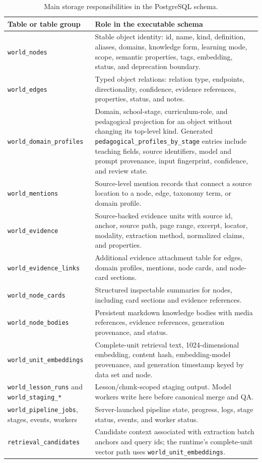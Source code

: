 \documentclass[11pt,letterpaper]{article}
\newcommand{\code}[1]{\nolinkurl{#1}}
\begin{document}
\begin{table}[H]
\centering
\small
\begin{tabularx}{\textwidth}{@{}p{}Y@{}}
\toprule
Table or table group & Role in the executable schema\\
\midrule
\code{world_nodes} & Stable object identity: id, name, kind, definition, aliases, domains, knowledge form, learning mode, scope, semantic properties, tags, embedding, status, and deprecation boundary.\\
\code{world_edges} & Typed object relations: relation type, endpoints, directionality, confidence, evidence references, properties, status, and notes.\\
\code{world_domain_profiles} & Domain, school-stage, curriculum-role, and pedagogical projection for an object without changing its top-level kind. Generated \code{pedagogical_profiles_by_stage} entries include teaching fields, source identifiers, model and prompt provenance, input fingerprint, confidence, and review state.\\
\code{world_mentions} & Source-level mention records that connect a source location to a node, edge, taxonomy term, or domain profile.\\
\code{world_evidence} & Source-backed evidence units with source id, anchor, source path, page range, excerpt, locator, modality, extraction method, normalized claims, and properties.\\
\code{world_evidence_links} & Additional evidence attachment table for edges, domain profiles, mentions, node cards, and node-card sections.\\
\code{world_node_cards} & Structured inspectable summaries for nodes, including card sections and evidence references.\\
\code{world_node_bodies} & Persistent markdown knowledge bodies with media references, evidence references, generation provenance, and status.\\
\code{world_unit_embeddings} & Complete-unit retrieval text, 1024-dimensional embedding, content hash, embedding-model provenance, and generation timestamp keyed by data set and node.\\
\code{world_lesson_runs} and \code{world_staging_*} & Lesson/chunk-scoped staging output. Model workers write here before canonical merge and QA.\\
\code{world_pipeline_jobs}, stages, events, workers & Server-launched pipeline state, progress, logs, stage status, events, and worker status.\\
\code{retrieval_candidates} & Candidate context associated with extraction batch anchors and query ids; the runtime's complete-unit vector path uses \code{world_unit_embeddings}.\\
\bottomrule
\end{tabularx}
\caption{Main storage responsibilities in the PostgreSQL schema.}
\label{tab:world-storage-summary}
\end{table}
\end{document}
